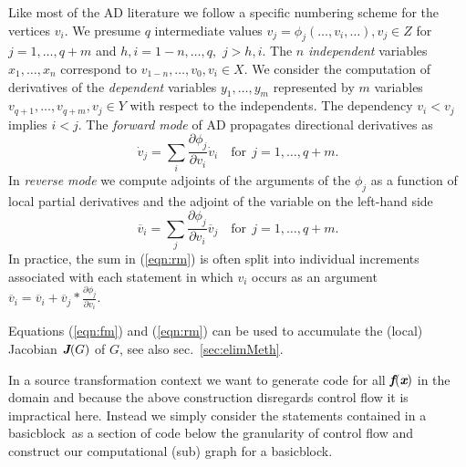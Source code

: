 \documentclass{book}
\newcommand{\basicblock}{basicblock}
\newcommand{\bmf}{\mbox{\bf\em f}}
\newcommand{\bmJ}{\mbox{\bf\em J}}
\newcommand{\bmx}{\mbox{\bf\em x}}
\newcommand{\refsec}[1]{{sec.~\ref{#1}}}
\newcommand{\refeqn}[1]{{(\ref{#1})}}
\begin{document}
Like most of the AD literature we follow a specific numbering scheme for the vertices $v_i$.
We presume $q$ intermediate values
$v_j = \phi_j(\ldots,v_i,\ldots), v_j\in Z$
for $j=1,\ldots,q+m$ and $h,i=1-n,\ldots,q,$ $j>h,i$. 
The $n$ {\em independent}
variables $x_1,\ldots,x_n$ correspond to 
$v_{1-n},\ldots,v_0, v_i\in X$. 
We consider the 
computation of derivatives of the {\em dependent} variables 
$y_1,\ldots,y_m$ represented by $m$ variables $v_{q+1},\ldots,v_{q+m}, v_j\in Y$
with respect to the independents. 
The dependency $v_i<v_j$ implies $i<j$. 
The {\em forward mode} of AD propagates directional derivatives
as 
\begin{equation} \label{eqn:fm}
  \dot{v}_j= \sum\limits_i\frac{\partial \phi_j}{\partial v_i}\dot{v}_i 
  \quad \text{for}~~j=1,\ldots,q+m.
\end{equation} 
In {\em reverse mode} we compute adjoints of the arguments of the $\phi_j$
as a function of local partial derivatives and the 
adjoint of the variable on the left-hand side
\begin{equation} \label{eqn:rm}
  \overline{v}_i= \sum\limits_j\frac{\partial \phi_j}{\partial v_i}\overline{v}_j 
  \quad \text{for}~~j=1,\ldots,q+m.
\end{equation} 
In practice, the sum in \refeqn{eqn:rm} is often split into individual increments 
associated with each statement in which $v_i$ occurs as an argument 
$\overline{v}_i=\overline{v}_i+\overline{v}_j * \frac{\partial \phi_j}{\partial v_i}$.

Equations \refeqn{eqn:fm} and \refeqn{eqn:rm} can be used to accumulate 
the (local) Jacobian $\bmJ(G)$
of $G$, see also \refsec{sec:elimMeth}. 

In a source transformation context we want to generate code for all $\bmf(\bmx)$
in the domain and because the above construction disregards control flow it is 
impractical here. Instead we simply consider the statements contained in a 
\basicblock\  as a section of code below the granularity of control flow and 
construct our computational (sub) graph for a \basicblock.   

\end{document}
